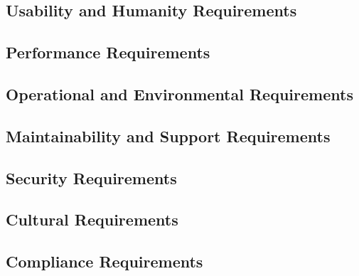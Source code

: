 \documentclass[12pt]{article}
\begin{document}
	\subsection{Usability and Humanity Requirements}
	\subsection{Performance Requirements}
	\subsection{Operational and Environmental Requirements}
	\subsection{Maintainability and Support Requirements}
	\subsection{Security Requirements}
	\subsection{Cultural Requirements}
	\subsection{Compliance Requirements}
	
\end{document}
